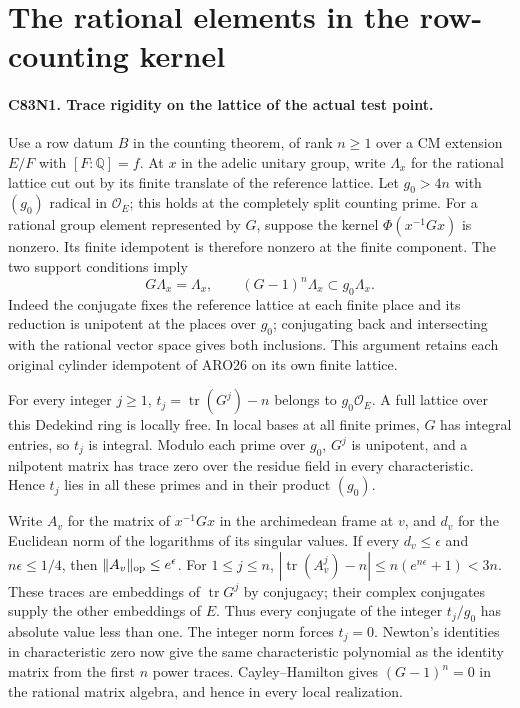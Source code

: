 \section{The rational elements in the row-counting kernel}

\paragraph{C83N1. Trace rigidity on the lattice of the actual test point.}
Use a row datum $B$ in the counting theorem, of rank $n\ge1$
over a CM extension $E/F$ with $[F:\mathbb Q]=f$. At $x$ in
the adelic unitary group, write $\Lambda_x$ for the rational
lattice cut out by its finite translate of the reference lattice.
Let $g_0>4n$ with $(g_0)$ radical in $\mathcal O_E$; this holds
at the completely split counting prime. For a rational group
element represented by $G$, suppose the kernel
$\Phi(x^{-1}Gx)$ is nonzero. Its finite idempotent is therefore
nonzero at the finite component. The two support conditions imply
\[
  G\Lambda_x=\Lambda_x,\qquad
   (G-1)^n\Lambda_x\subset g_0\Lambda_x .
\]
Indeed the conjugate fixes the reference lattice at each finite
place and its reduction is unipotent at the places over $g_0$;
conjugating back and intersecting with the rational vector space
gives both inclusions. This argument retains each original
cylinder idempotent of ARO26 on its own finite lattice.

For every integer $j\ge1$, $t_j=\operatorname{tr}(G^j)-n$
belongs to $g_0\mathcal O_E$. A full lattice over this Dedekind
ring is locally free. In local bases at all finite primes, $G$
has integral entries, so $t_j$ is integral. Modulo each prime
over $g_0$, $G^j$ is unipotent, and a nilpotent matrix has trace
zero over the residue field in every characteristic. Hence
$t_j$ lies in all these primes and in their product $(g_0)$.

Write $A_v$ for the matrix of $x^{-1}Gx$ in the archimedean
frame at $v$, and $d_v$ for the Euclidean norm of the logarithms
of its singular values. If every $d_v\le\epsilon$ and
$n\epsilon\le1/4$, then $\|A_v\|_{\rm op}\le e^\epsilon$.
For $1\le j\le n$,
$|\operatorname{tr}(A_v^j)-n|\le n(e^{n\epsilon}+1)<3n$.
These traces are embeddings of $\operatorname{tr}G^j$ by
conjugacy; their complex conjugates supply the other embeddings
of $E$. Thus every conjugate of the integer $t_j/g_0$ has
absolute value less than one. The integer norm forces $t_j=0$.
Newton's identities in characteristic zero now give the same
characteristic polynomial as the identity matrix from the first
$n$ power traces. Cayley--Hamilton gives $(G-1)^n=0$ in the
rational matrix algebra, and hence in every local realization.

